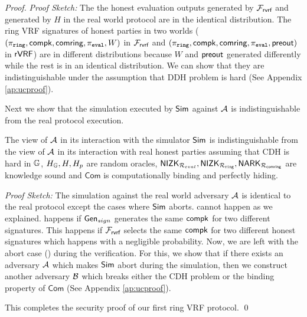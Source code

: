 \begin{proof}
	\noindent \textit{Proof Sketch:} 	The the honest evaluation outputs generated by $ \mathcal{F}_{\textsf{rvrf}} $ and generated by $ H $ in the real world protocol are in the identical distribution. The ring VRF signatures of honest parties in two worlds ($ (\pi_{\mathtt{ring}}, \mathsf{compk}, \mathsf{comring}, \pi_{\mathtt{eval}}, W) $ in $ \mathcal{F}_{\textsf{rvrf}} $ and $ (\pi_{\mathtt{ring}}, \mathsf{compk}, \mathsf{comring}, \pi_{\mathtt{eval}}, {\mathsf{preout}}) $ in $ {\mathsf{rVRF}} $) are in different distributions because $ W $ and $ {\mathsf{preout}} $ generated differently while the rest is in an identical distribution. We can show that they are indistinguishable under the assumption that DDH problem is hard (See Appendix \ref{ap:ucproof}).
	
	
	Next we show that the simulation executed by $ \mathsf{Sim} $ against $ \mathcal{A} $ is indistinguishable from the real protocol execution.
	
	\begin{lemma} \label{lem:simulation-ind}
		The view of $ \mathcal{A} $ in its interaction with the simulator $ \mathsf{Sim} $ is indistinguishable from the view of $ \mathcal{A} $ in its interaction with real honest parties assuming that CDH is hard in $ {\mathbb{G}} $, $H_{\mathbb{G}}, H, H_p $ are random oracles, $ {\mathsf{NIZK}}_{\mathcal{R}_{eval}}, {\mathsf{NIZK}}_{\mathcal{R}_{\mathtt{ring}}}, \mathsf{NARK}_{\mathcal{R}_{\mathsf{comring}}} $ are knowledge sound and $ \mathsf{Com} $ is computationally binding and perfectly hiding. 
	\end{lemma}

	\textit{Proof Sketch:} The  simulation against the real world adversary $ \mathcal{A} $ is identical to the real protocol except the cases where $ \mathsf{Sim} $ aborts.  cannot happen as we explained.   happens if $ \mathsf{Gen}_{sign} $ generates the same $ \mathsf{compk} $ for two different signatures. This happens if $ \mathcal{F}_{\textsf{rvrf}} $  selects the same $ \mathsf{compk} $ for two different honest signatures which happens with a negligible probability.
	Now, we are left with the abort case () during the verification.
	For this, we show that if there exists an adversary $ \mathcal{A} $ which makes $ \mathsf{Sim} $ abort during the simulation, then we construct another adversary $ \mathcal{B} $ which breaks either the CDH problem or the binding property of $ \mathsf{Com}$  (See Appendix \ref{ap:ucproof}).
	
	
	This completes the security proof of our first  ring VRF protocol. \qed
\end{proof}

